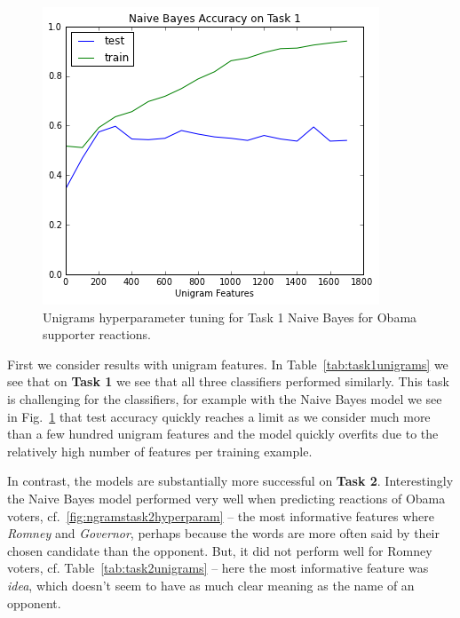 \begin{figure}[]
	\centering
	\includegraphics[scale=0.55]{Figures/ngrams_hyperparam_task1.png}
	\caption{Unigrams hyperparameter tuning for Task 1 Naive Bayes for Obama supporter reactions.}
	\label{fig:ngramstask1hyperparam}
\end{figure}

First we consider results with unigram features. In Table~\ref{tab:task1unigrams} we see that on \textbf{Task 1} we see that all three classifiers performed similarly.  This task is challenging for the classifiers, for example with the Naive Bayes model we see in Fig.~\ref{fig:ngramstask1hyperparam} that test accuracy quickly reaches a limit as we consider much more than a few hundred unigram features and the model quickly overfits due to the relatively high number of features per training example.

In contrast, the models are substantially more successful on \textbf{Task 2}.  Interestingly the Naive Bayes model performed very well when predicting reactions of Obama voters, cf.~\ref{fig:ngramstask2hyperparam} -- the most informative features where \emph{Romney} and \emph{Governor}, perhaps because the words are more often said by their chosen candidate than the opponent.  But, it did not perform well for Romney voters, cf. Table~\ref{tab:task2unigrams} -- here the most informative feature was \emph{idea}, which doesn't seem to have as much clear meaning as the name of an opponent. 


